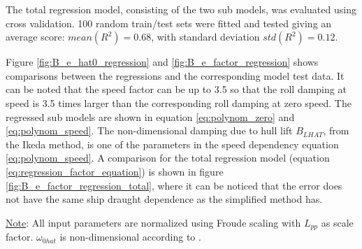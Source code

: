 The total regression model, consisting of the two sub models, was evaluated using cross validation. 100 random train/test sets were fitted and tested giving an average score: $mean(R^2)=0.68$, with standard deviation $std(R^2)=0.12$.

Figure \ref{fig:B_e_hat0_regression} and \ref{fig:B_e_factor_regression} shows comparisons between the regressions and the corresponding model test data. It can be noted that the speed factor can be up to 3.5 so that the roll damping at speed is 3.5 times larger than the corresponding roll damping at zero speed. The regressed sub models are shown in equation \ref{eq:polynom_zero} and \ref{eq:polynom_speed}. The non-dimensional damping due to hull lift $B_{LHAT}$, from the Ikeda method, is one of the parameters in the speed dependency equation \ref{eq:polynom_speed}. A comparison for the total regression model (equation \ref{eq:regression_factor_equation}) is shown in figure \ref{fig:B_e_factor_regression_total}, where it can be noticed that the error does not have the same ship draught dependence as the simplified method has. 



{\footnotesize \underline{Note}: All input parameters are normalized using Froude scaling with $L_{pp}$ as scale factor. $\omega_{0hat}$ is non-dimensional according to \parencite{himeno_prediction_1981}.} 

